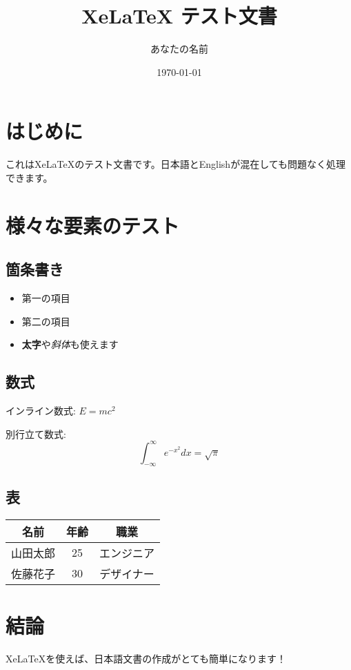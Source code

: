 \documentclass[11pt,a4paper]{article}
\title{XeLaTeX テスト文書}
\author{あなたの名前}
\date{\today}
\begin{document}
\maketitle

\section{はじめに}
これはXeLaTeXのテスト文書です。日本語とEnglishが混在しても問題なく処理できます。

\section{様々な要素のテスト}

\subsection{箇条書き}
\begin{itemize}
    \item 第一の項目
    \item 第二の項目
    \item \textbf{太字}や\textit{斜体}も使えます
\end{itemize}

\subsection{数式}
インライン数式: $E = mc^2$

別行立て数式:
\[
\int_{-\infty}^{\infty} e^{-x^2} dx = \sqrt{\pi}
\]

\subsection{表}
\begin{tabular}{|c|c|c|}
\hline
名前 & 年齢 & 職業 \\
\hline
山田太郎 & 25 & エンジニア \\
\hline
佐藤花子 & 30 & デザイナー \\
\hline
\end{tabular}

\section{結論}
XeLaTeXを使えば、日本語文書の作成がとても簡単になります！
\end{document}
